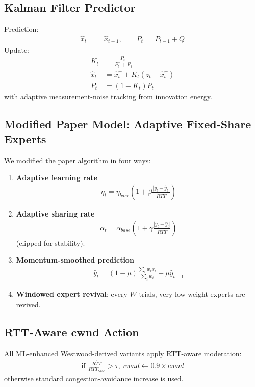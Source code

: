 \documentclass[11pt,a4paper]{article}
\begin{document}
\subsection{Kalman Filter Predictor}
Prediction:
\begin{align}
\hat{x}_{t}^{-} &= \hat{x}_{t-1}, \qquad P_t^- = P_{t-1}+Q
\end{align}
Update:
\begin{align}
K_t &= \frac{P_t^-}{P_t^-+R_t}\\
\hat{x}_t &= \hat{x}_{t}^{-}+K_t(z_t-\hat{x}_t^-)\\
P_t &= (1-K_t)P_t^-
\end{align}
with adaptive measurement-noise tracking from innovation energy.

\subsection{Modified Paper Model: Adaptive Fixed-Share Experts}
We modified the paper algorithm in four ways:
\begin{enumerate}
    \item \textbf{Adaptive learning rate}
    \begin{align}
    \eta_t = \eta_{base}\left(1+\beta\frac{|y_t-\hat{y}_t|}{\overline{RTT}}\right)
    \end{align}
    \item \textbf{Adaptive sharing rate}
    \begin{align}
    \alpha_t = \alpha_{base}\left(1+\gamma\frac{|y_t-\hat{y}_t|}{\overline{RTT}}\right)
    \end{align}
    (clipped for stability).
    \item \textbf{Momentum-smoothed prediction}
    \begin{align}
    \hat{y}_t = (1-\mu)\frac{\sum_i w_i x_i}{\sum_i w_i}+\mu\hat{y}_{t-1}
    \end{align}
    \item \textbf{Windowed expert revival}: every $W$ trials, very low-weight experts are revived.
\end{enumerate}

\subsection{RTT-Aware cwnd Action}
All ML-enhanced Westwood-derived variants apply RTT-aware moderation:
\begin{align}
\text{if }\frac{\hat{RTT}}{RTT_{base}} > \tau,\; cwnd \leftarrow 0.9\times cwnd
\end{align}
otherwise standard congestion-avoidance increase is used.
\end{document}
